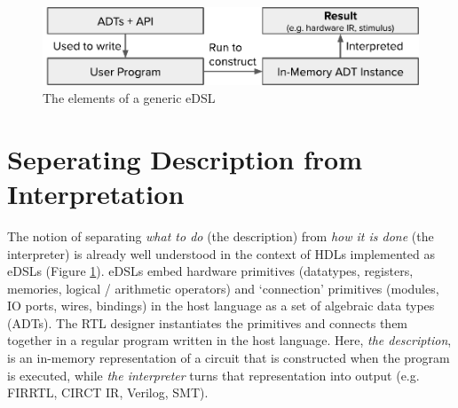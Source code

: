 \documentclass[sigplan,review,nonacm,9pt]{acmart}
\begin{document}

\maketitle

\begin{figure}[h]
\includegraphics[width=\linewidth]{simcommand/functional_apis.pdf}
\caption{The elements of a generic eDSL}
\label{fig:functional_apis}
\end{figure}

\section{Seperating Description from Interpretation}


The notion of separating \textit{what to do} (the description) from \textit{how it is done} (the interpreter) is already well understood in the context of HDLs implemented as eDSLs (Figure \ref{fig:functional_apis}).
eDSLs embed hardware primitives (datatypes, registers, memories, logical / arithmetic operators) and `connection' primitives (modules, IO ports, wires, bindings) in the host language as a set of algebraic data types (ADTs).
The RTL designer instantiates the primitives and connects them together in a regular program written in the host language.
Here, \textit{the description}, is an in-memory representation of a circuit that is constructed when the program is executed, while \textit{the interpreter} turns that representation into output (e.g. FIRRTL\cite{firrtl}, CIRCT IR\cite{circt}, Verilog, SMT).
\end{document}
